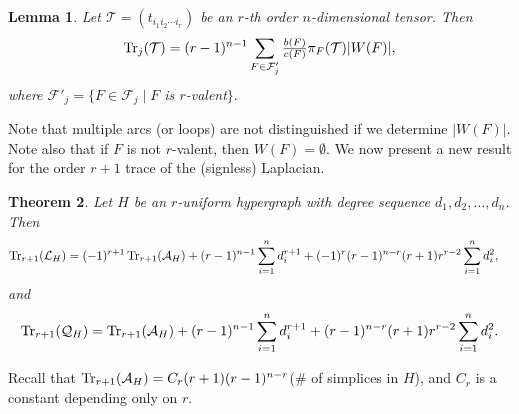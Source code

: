 \documentclass[11pt]{article}
\newtheorem{theorem}{Theorem}[section]
\newtheorem{lemma}[theorem]{Lemma}
\def\Tr{\mathop{\rm Tr }\nolimits}
\begin{document}
\noindent\begin{lemma}\label{le:3-2}\cite{SQH}
Let $\mathcal{T}=(t_{i_{1}i_{2}\cdots i_{r}})$ be an $r$-th order $n$-dimensional tensor. Then
$$\Tr_{j}(\mathcal{T})=(r-1)^{n-1}\sum_{F\in \mathcal{F}'_{j}}\tfrac{b(F)}{c(F)}\pi_{F}(\mathcal{T})\lvert W(F)\rvert,$$
where $\mathcal{F}'_{j}=\{F\in  \mathcal{F}_{j} \mid F$ is $r$-valent$\}.$
\end{lemma}

Note that multiple arcs (or loops) are not distinguished if we determine $\lvert W(F)\rvert.$ Note also that if $F$ is not $r$-valent, then $W(F)=\emptyset$.
We now present a new result for the order $r+1$ trace of the (signless) Laplacian.

\noindent\begin{theorem}\label{th:3-1}
Let $H$ be an $r$-uniform hypergraph with degree sequence $d_{1}, d_{2}, \ldots, d_{n}$. Then
\begin{align*}
\Tr_{r+1}(\mathcal{L}_{H})&=(-1)^{r+1}\Tr_{r+1}(\mathcal{A}_{H})+(r-1)^{n-1}\sum_{i=1}^{n}d_{i}^{r+1}+(-1)^{r}(r-1)^{n-r}(r+1)r^{r-2}\sum_{i=1}^{n}d_{i}^{2},
\end{align*}
and
\begin{align*}
\Tr_{r+1}(\mathcal{Q}_{H})=\Tr_{r+1}(\mathcal{A}_{H})+(r-1)^{n-1}\sum_{i=1}^{n}d_{i}^{r+1}+(r-1)^{n-r}(r+1)r^{r-2}\sum_{i=1}^{n}d_{i}^{2}.
\end{align*}
\end{theorem}
Recall that $\Tr_{r+1}(\mathcal{A}_{H})=C_{r}(r+1)(r-1)^{n-r}$(\# of simplices in $H$), and $C_{r}$ is a constant depending only on $r.$
\end{document}
